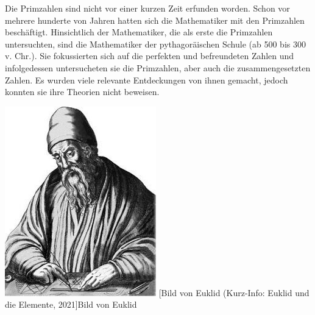\begin{minipage}{0.65\linewidth}
Die Primzahlen sind nicht vor einer kurzen Zeit erfunden
worden. Schon vor mehrere hunderte von Jahren hatten sich
die Mathematiker mit den Primzahlen beschäftigt.
Hinsichtlich der Mathematiker, die als erste die Primzahlen
untersuchten, sind die Mathematiker der pythagoräischen
Schule (ab 500 bis 300 v. Chr.). Sie fokussierten sich auf
die perfekten und befreundeten Zahlen und infolgedessen
untersucheten sie die Primzahlen, aber auch die
zusammengesetzten Zahlen. Es wurden viele relevante
Entdeckungen von ihnen gemacht, jedoch konnten sie ihre
Theorien nicht beweisen.
\end{minipage}
\hfil
\begin{minipage}[r]{0.3\linewidth}
  \captionsetup{type=figure,font=small,skip=6pt,format=plain}%
  \capstart
  \includegraphics[width=1.0\linewidth]{./images/euklid.jpg}
  [Bild von Euklid (Kurz-Info: Euklid und die Elemente,
2021]{Bild von Euklid}
  \label{fig:portrait_euklid}
\end{minipage}
\vspace{.3cm}

